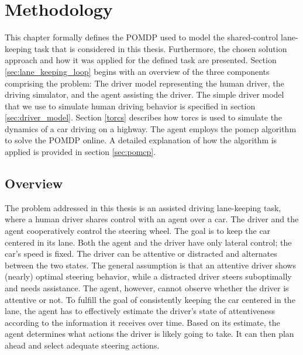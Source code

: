 \chapter{Methodology}
\label{ch:problem}

This chapter formally defines the POMDP used to model the shared-control lane-keeping task that is considered in this thesis. Furthermore, the chosen solution approach and how it was applied for the defined task are presented. Section \ref{sec:lane_keeping_loop} begins with an overview of the three components comprising the problem: The driver model representing the human driver, the driving simulator, and the agent assisting the driver. The simple driver model that we use to simulate human driving behavior is specified in section \ref{sec:driver_model}. Section \ref{torcs} describes how \acrfull{torcs} is used to simulate the dynamics of a car driving on a highway. The agent employs the \acrfull{pomcp} algorithm to solve the POMDP online. A detailed explanation of how the algorithm is applied is provided in section \ref{sec:pomcp}.

\section{Overview}

The problem addressed in this thesis is an assisted driving lane-keeping task, where a human driver shares control with an agent over a car. The driver and the agent cooperatively control the steering wheel. The goal is to keep the car centered in its lane. Both the agent and the driver have only lateral control; the car's speed is fixed. The driver can be attentive or distracted and alternates between the two states. The general assumption is that an attentive driver shows (nearly) optimal steering behavior, while a distracted driver steers suboptimally and needs assistance. The agent, however, cannot observe whether the driver is attentive or not. To fulfill the goal of consistently keeping the car centered in the lane, the agent has to effectively estimate the driver's state of attentiveness according to the information it receives over time. Based on its estimate, the agent determines what actions the driver is likely going to take. It can then plan ahead and select adequate steering actions.


